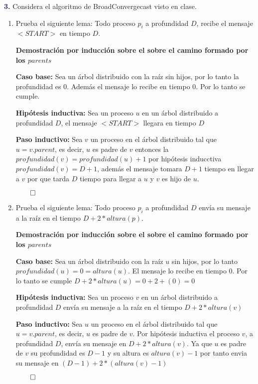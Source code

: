 \newpage
\textbf{\textcolor{MidnightBlue}{3.}}
Considera el algoritmo de BroadConvergecast visto en clase.
\begin{enumerate}
\item Prueba el siguiente lema:    
      \guillemotleft Todo proceso $p_i$ a profundidad
      $D$, recibe el mensaje $<START>$ en tiempo $D$\guillemotright.

      \textbf{Demostración por inducción sobre el sobre el camino formado por los $parents$}
      
	\textbf{Caso base:}
	Sea un árbol distribuido con la raíz sin hijos, por lo tanto la profundidad es 0. Además el mensaje lo recibe en tiempo 0. Por lo tanto se cumple.
  
	\textbf{Hipótesis inductiva:}
	Sea un proceso $u$ en un árbol distribuido a profundidad $D$, el mensaje $<START>$ llegara en tiempo $D$
	
	\textbf{Paso inductivo:}
	Sea $v$ un proceso en el árbol distribuido tal que $u = v.parent$, es decir, $u$ es padre de $v$ entonces la $profundidad(v) = profundidad(u)+1$ por hipótesis inducctiva $profundidad(v) = D+1$, además el mensaje tomara $D+1$ tiempo en llegar a $v$ por que tarda $D$ tiempo para llegar a $u$ y $v$ es hijo de $u$.
	
	$\qed$
	
\item Prueba el siguiente lema:      
      \guillemotleft Todo proceso $p_i$ a profundidad $D$
      envía su mensaje a la raíz en el tiempo $D+2*altura(p)$\guillemotright.


      \textbf{Demostración por inducción sobre el sobre el camino formado por los $parents$}
      
	\textbf{Caso base:}
	Sea un árbol distribuido con la raíz $u$ sin hijos, por lo tanto $profundidad(u)=0=altura(u)$. El mensaje lo recibe en tiempo 0. Por lo tanto se cumple $D+2*altura(u)=0+2+(0)=0$
	
	\textbf{Hipótesis inductiva:}
	Sea un proceso $v$ en un árbol distribuido a profundidad $D$ envía su mensaje a la raíz en el tiempo $D+2*altura(v)$
	
	\textbf{Paso inductivo:}
	Sea $u$ un proceso en el árbol distribuido tal que $u = v.parent$, es decir, $u$ es padre de $v$. Por hipótesis inductiva el proceso $v$, a profundidad $D$, envía su mensaje  en  $D+2*altura(v)$. Ya que $u$ es padre de $v$ su profundidad es $D-1$ y su altura es $altura(v)-1$ por tanto envia su mensaje en $(D-1)+2*(altura(v)-1)$
	
	$\qed$
\end{enumerate} 
